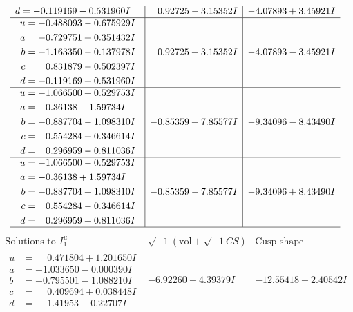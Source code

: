 \documentclass[1p]{elsarticle_modified}
\theoremstyle{definition}
\newcommand{\I}{\sqrt{-1}}
\begin{document}
$$\begin{array}{c|c|c}
\begin{aligned}
d &= -0.119169 - 0.531960 I\end{aligned}
 & \phantom{-}0.92725 - 3.15352 I & -4.07893 + 3.45921 I \\ \hline\begin{aligned}
u &= -0.488093 - 0.675929 I \\
a &= -0.729751 + 0.351432 I \\
b &= -1.163350 - 0.137978 I \\
c &= \phantom{-}0.831879 - 0.502397 I \\
d &= -0.119169 + 0.531960 I\end{aligned}
 & \phantom{-}0.92725 + 3.15352 I & -4.07893 - 3.45921 I \\ \hline\begin{aligned}
u &= -1.066500 + 0.529753 I \\
a &= -0.36138 - 1.59734 I \\
b &= -0.887704 - 1.098310 I \\
c &= \phantom{-}0.554284 + 0.346614 I \\
d &= \phantom{-}0.296959 - 0.811036 I\end{aligned}
 & -0.85359 + 7.85577 I & -9.34096 - 8.43490 I \\ \hline\begin{aligned}
u &= -1.066500 - 0.529753 I \\
a &= -0.36138 + 1.59734 I \\
b &= -0.887704 + 1.098310 I \\
c &= \phantom{-}0.554284 - 0.346614 I \\
d &= \phantom{-}0.296959 + 0.811036 I\end{aligned}
 & -0.85359 - 7.85577 I & -9.34096 + 8.43490 I\\
 \hline 
 \end{array}$$\newpage$$\begin{array}{c|c|c}  
\text{Solutions to }I^u_{1}& \I (\text{vol} + \sqrt{-1}CS) & \text{Cusp shape}\\
 \hline 
\begin{aligned}
u &= \phantom{-}0.471804 + 1.201650 I \\
a &= -1.033650 - 0.000390 I \\
b &= -0.795501 - 1.088210 I \\
c &= \phantom{-}0.409694 + 0.038448 I \\
d &= \phantom{-}1.41953 - 0.22707 I\end{aligned}
 & -6.92260 + 4.39379 I & -12.55418 - 2.40542 I \\ \hline\begin{aligned}

\end{aligned}
\end{array}$$
\end{document}
